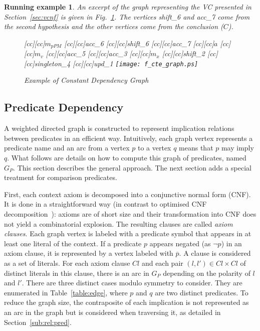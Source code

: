 \documentclass{acm_proc_article-sp}
\theoremstyle{nonumberplain}
\newtheorem{xpl}{Running example}}
\newcommand{\clause}{\mathit{Cl}}
\begin{document}
\begin{xpl}
An excerpt of the graph representing the VC presented in
Section~\ref{sec:vcnf} is given in Fig.~\ref{fig:dep_graph_var}.
The vertices \textit{shift}\_6 and \textit{acc}\_7 come from the second 
hypothesis and the other vertices come from the conclusion ($C$).

\begin{figure}[htb!]
\begin{center}
[cc][cc]{$m_{pPM}$}
[cc][cc]{\textit{acc}\_6}
[cc][cc]{\textit{shift}\_6}
[cc][cc]{\textit{acc}\_7}
[cc][cc]{$a$}
[cc][cc]{$m_v$}
[cc][cc]{\textit{acc}\_5}
[cc][cc]{\textit{acc}\_3}
[cc][cc]{$m_x$}
[cc][cc]{\textit{shift}\_2}
[cc][cc]{\textit{singleton}\_4}
[cc][cc]{\textit{upd}\_1}
\texttt{[image: f\_cte\_graph.ps]}
\end{center}
\caption{Example of Constant Dependency Graph\label{fig:dep_graph_var}}
\end{figure}
\end{xpl}




\subsection{Predicate Dependency}\label{sub:dep:stat}
A weighted directed graph is constructed to represent implication
relations between predicates in an efficient way. Intuitively, each
graph vertex represents a predicate name and an arc from a vertex \(p\)
to a vertex \(q\) means that \(p\) may imply \(q\). What follows are
details on how to compute this graph of predicates, named $G_P$. This
section describes the general approach. The next section adds a special
treatment for comparison predicates.


First, each context axiom is decomposed into a conjunctive normal form
(CNF). It is done in a straightforward way (in contrast to optimised
CNF decomposition~\cite{NW01}): axioms are of short size and their
transformation into CNF does not yield a combinatorial explosion. The
resulting clauses are called \emph{axiom clauses}. Each graph vertex is
labeled with a predicate symbol that appears in at least one literal of
the context. If a predicate $p$ appears negated (as $\neg p$) in an
axiom clause, it is represented by a vertex labeled with
$\overline{p}$. A clause is considered as a set of literals. For each
axiom clause $\clause$ and each pair $(l,l') \in \clause \times
\clause$ of distinct literals in this clause, there is an arc in $G_P$
depending on the polarity of \(l\) and \(l'\). There are three distinct
cases modulo symmetry to consider. They are enumerated in
Table~\ref{table:edge}, where $p$ and $q$ are two distinct predicates.
To reduce the graph size, the contraposite of each implication is not
represented as an arc in the graph but is considered when traversing
it, as detailed in Section~\ref{sub:rel:pred}.
\end{document}
